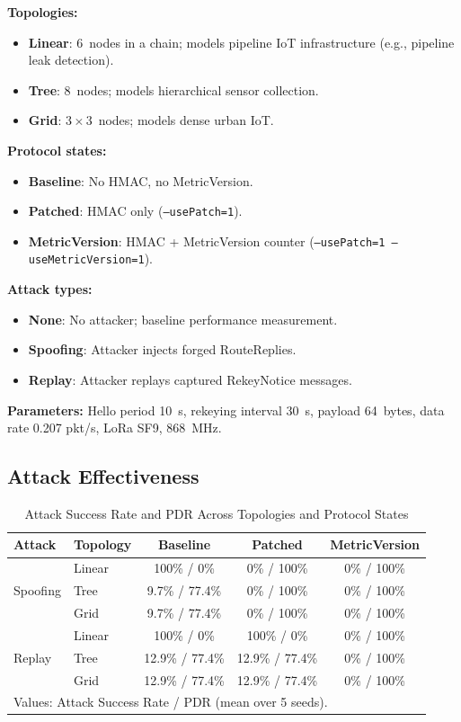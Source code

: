 \documentclass[journal]{IEEEtran}
\begin{document}
\textbf{Topologies:}
\begin{itemize}
  \item \textbf{Linear}: 6~nodes in a chain; models pipeline IoT
    infrastructure (e.g., pipeline leak detection).
  \item \textbf{Tree}: 8~nodes; models hierarchical sensor collection.
  \item \textbf{Grid}: $3\times3$~nodes; models dense urban IoT.
\end{itemize}

\textbf{Protocol states:}
\begin{itemize}
  \item \textbf{Baseline}: No HMAC, no MetricVersion.
  \item \textbf{Patched}: HMAC only (\texttt{--usePatch=1}).
  \item \textbf{MetricVersion}: HMAC + MetricVersion counter
    (\texttt{--usePatch=1 --useMetricVersion=1}).
\end{itemize}

\textbf{Attack types:}
\begin{itemize}
  \item \textbf{None}: No attacker; baseline performance measurement.
  \item \textbf{Spoofing}: Attacker injects forged RouteReplies.
  \item \textbf{Replay}: Attacker replays captured RekeyNotice messages.
\end{itemize}

\textbf{Parameters:} Hello period 10~s, rekeying interval 30~s,
payload 64~bytes, data rate 0.207 pkt/s, LoRa SF9, 868~MHz.

\subsection{Attack Effectiveness}

\begin{table}[t]
  \centering
  \caption{Attack Success Rate and PDR Across Topologies and Protocol States}
  \label{tab:attack-results}
  \setlength{\tabcolsep}{4pt}
  \begin{tabular}{llccc}
    \toprule
    \textbf{Attack} & \textbf{Topology} &
      \textbf{Baseline} & \textbf{Patched} & \textbf{MetricVersion} \\
    \midrule
    \multirow{3}{*}{Spoofing}
      & Linear & 100\% / 0\% & 0\% / 100\% & 0\% / 100\% \\
      & Tree   &  9.7\% / 77.4\% & 0\% / 100\% & 0\% / 100\% \\
      & Grid   &  9.7\% / 77.4\% & 0\% / 100\% & 0\% / 100\% \\
    \midrule
    \multirow{3}{*}{Replay}
      & Linear & 100\% / 0\%     & 100\% / 0\% & 0\% / 100\% \\
      & Tree   & 12.9\% / 77.4\% & 12.9\% / 77.4\% & 0\% / 100\% \\
      & Grid   & 12.9\% / 77.4\% & 12.9\% / 77.4\% & 0\% / 100\% \\
    \bottomrule
    \multicolumn{5}{l}{\footnotesize Values: Attack Success Rate / PDR (mean over 5 seeds).}
  \end{tabular}
\end{table}
\end{document}
